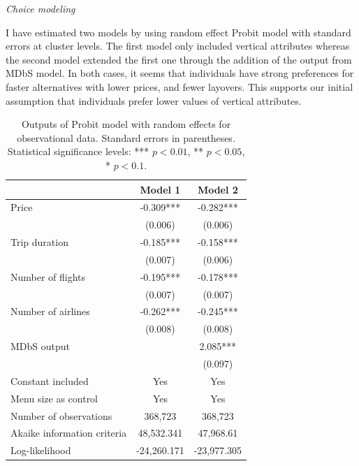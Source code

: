 \documentclass[a4paper,12pt]{article}
\begin{document}
\textit{Choice modeling}

I have estimated two models by using random effect Probit model with standard errors at cluster levels. The first model only included vertical attributes whereas the second model extended the first one through the addition of the output from MDbS model. In both cases, it seems that individuals have strong preferences for faster alternatives with lower prices, and fewer layovers. This supports our initial assumption that individuals prefer lower values of vertical attributes. 

\begin{table}
    \centering

    \begin{tabular}{lcc}
    \hline
     & Model 1 & Model 2 \\
    \hline
    Price & -0.309*** & -0.282*** \\
     & (0.006) & (0.006) \\[1ex]
    Trip duration & -0.185*** & -0.158*** \\
     & (0.007) & (0.006) \\[1ex]
    Number of flights & -0.195*** & -0.178*** \\
     & (0.007) & (0.007) \\[1ex]
    Number of airlines & -0.262*** & -0.245*** \\
     & (0.008) & (0.008) \\[1ex]
    MDbS output & & 2.085*** \\
     & & (0.097) \\[1ex]
    Constant included & Yes & Yes \\[1ex]
    Menu size as control & Yes & Yes \\[1ex]
    Number of observations & 368,723 & 368,723 \\[1ex]
    Akaike information criteria & 48,532.341 & 47,968.61 \\[1ex]
    Log-likelihood & -24,260.171 & -23,977.305 \\[1ex]
    \hline
    \end{tabular}
    \caption{Outputs of Probit model with random effects for observational data. Standard errors in parentheses. Statistical significance levels: *** $p<0.01$, ** $p<0.05$, * $p<0.1.$}
    \label{tab:amadeusProbitResults}
\end{table}
\end{document}
